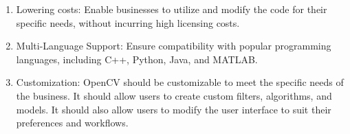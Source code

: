 \begin{enumerate}
    \item Lowering costs: Enable businesses to utilize and modify the code for their specific needs, without incurring high licensing costs.
    \item Multi-Language Support: Ensure compatibility with popular programming languages, including C++, Python, Java, and MATLAB.      
    \item Customization: OpenCV should be customizable to meet the specific needs of the business. It should allow users to create custom filters, algorithms, and models. It should also allow users to modify the user interface to suit their preferences and workflows.
\end{enumerate}